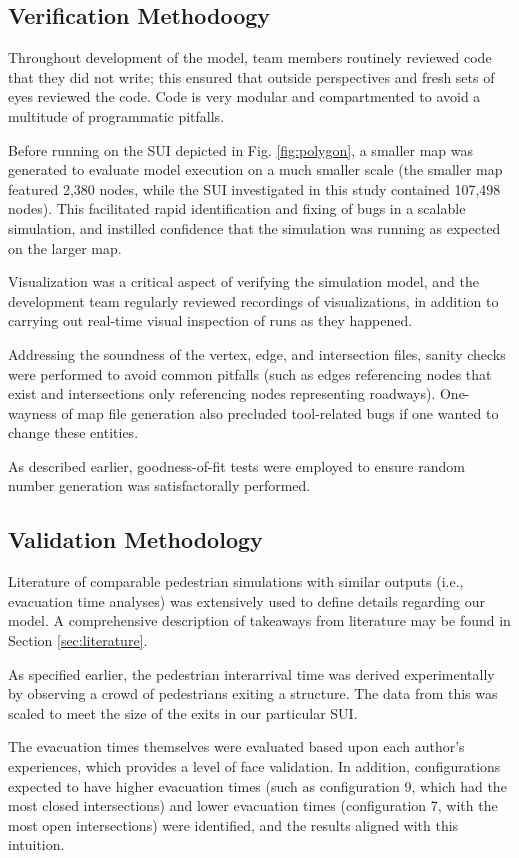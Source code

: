 \documentclass[12pt]{article}
\begin{document}
\subsection{Verification Methodoogy}
Throughout development of the model, team members routinely reviewed code
that they did not write; this ensured that outside perspectives and fresh
sets of eyes reviewed the code.  Code is very modular and compartmented to avoid
a multitude of programmatic pitfalls.

Before running on the SUI depicted in Fig. \ref{fig:polygon}, a smaller map
was generated to evaluate model execution on a much smaller scale (the smaller
map featured 2,380 nodes, while the SUI investigated in this study contained
107,498 nodes). This facilitated rapid identification and fixing of bugs in
a scalable simulation, and instilled confidence that the simulation was running
as expected on the larger map.

Visualization was a critical aspect of verifying the simulation model, and
the development team regularly reviewed recordings of visualizations, in
addition to carrying out real-time visual inspection of runs as they happened.

Addressing the soundness of the vertex, edge, and intersection files, sanity
checks were performed to avoid common pitfalls (such as edges referencing
nodes that exist and intersections only referencing nodes representing
roadways). One-wayness of map file generation also precluded tool-related
bugs if one wanted to change these entities.

As described earlier, goodness-of-fit tests were employed to ensure random
number generation was satisfactorally performed.

\subsection{Validation Methodology}
Literature of comparable pedestrian simulations with similar outputs (i.e.,
evacuation time analyses) was extensively used to define details regarding
our model. A comprehensive description of takeaways from literature may be
found in Section \ref{sec:literature}.

As specified earlier, the pedestrian interarrival time was derived
experimentally by observing a crowd of pedestrians exiting a structure. The
data from this was scaled to meet the size of the exits in our particular SUI.

The evacuation times themselves were evaluated based upon each author's
experiences, which provides a level of face validation. In addition,
configurations expected to have higher evacuation times (such as configuration
9, which had the most closed intersections) and lower evacuation times
(configuration 7, with the most open intersections) were identified, and the
results aligned with this intuition.
\end{document}
